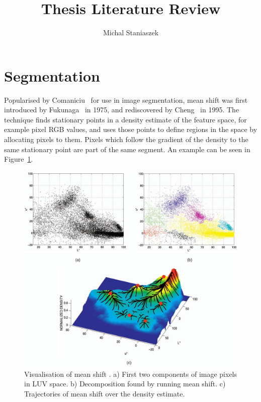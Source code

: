 \documentclass[10pt,a4paper]{article}
\author{Michal Staniaszek}
\title{Thesis Literature Review}
\begin{document}
\maketitle
\section{Segmentation}
Popularised by Comaniciu~\cite{comaniciu2002mean} for use in image segmentation,
mean shift was first introduced by Fukunaga~\cite{fukunaga1975estimation} in
1975, and rediscovered by Cheng~\cite{cheng1995mean} in 1995. The technique finds
stationary points in a density estimate of the feature space, for example pixel
RGB values, and uses those points to define regions in the space by allocating
pixels to them. Pixels which follow the gradient of the density to the same
stationary point are part of the same segment. An example can be seen in
Figure~\ref{fig:meanshift}.
\begin{figure}[t]
  \centering
  \includegraphics[width=\textwidth]{images/meanshift}
  \caption{Visualisation of mean shift \cite{comaniciu2002mean}. a) First two
    components of image pixels in LUV space. b) Decomposition found by running
    mean shift. c) Trajectories of mean shift over the density estimate.}
  \label{fig:meanshift}
\end{figure}
\end{document}
